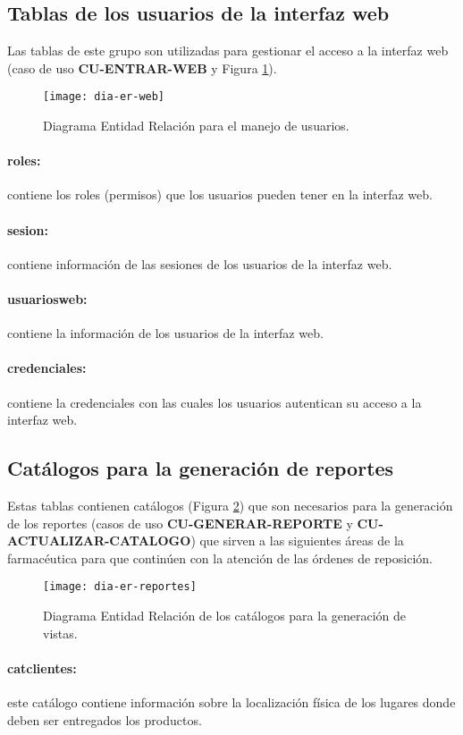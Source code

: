 \subsection{Tablas de los usuarios de la interfaz web}
Las tablas de este grupo son utilizadas para gestionar el acceso a la interfaz web (caso de uso \textbf{CU-ENTRAR-WEB} y Figura \ref{fig:dia-er-web}).
\begin{figure}[h]
  \centering
  \texttt{[image: dia-er-web]} 
  \caption{Diagrama Entidad Relación para el manejo de usuarios.}
  \label{fig:dia-er-web}
\end{figure}
\paragraph{roles:} contiene los roles (permisos) que los usuarios pueden tener en la interfaz web.
\paragraph{sesion:} contiene información de las sesiones de los usuarios de la interfaz web.
\paragraph{usuarios{\textunderscore}web:} contiene la información de los usuarios de la interfaz web.
\paragraph{credenciales:} contiene la credenciales con las cuales los usuarios autentican su acceso a la interfaz web.


\subsection{Catálogos para la generación de reportes}
Estas tablas contienen catálogos (Figura \ref{fig:dia-er-reportes}) que son necesarios para la generación de los reportes (casos de uso \textbf{CU-GENERAR-REPORTE} y \textbf{CU-ACTUALIZAR-CATALOGO}) que sirven a las siguientes áreas de la farmacéutica para que continúen con la atención de las órdenes de reposición.
\begin{figure}[h]
  \centering
  \texttt{[image: dia-er-reportes]} 
  \caption{Diagrama Entidad Relación de los catálogos para la generación de vistas.}
  \label{fig:dia-er-reportes}
\end{figure}
\paragraph{cat{\textunderscore}clientes:} este catálogo contiene información sobre la localización física de los lugares donde deben ser entregados los productos.
